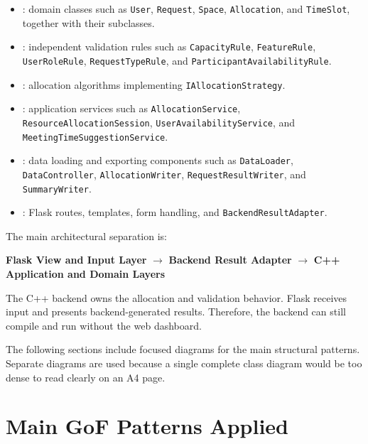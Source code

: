 \documentclass[12pt,a4paper]{article}
\begin{document}
\begin{itemize}
    \item {}: domain classes such as \texttt{User},
    \texttt{Request}, \texttt{Space}, \texttt{Allocation}, and
    \texttt{TimeSlot}, together with their subclasses.

    \item {}: independent validation rules such as
    \texttt{CapacityRule}, \texttt{FeatureRule}, \texttt{UserRoleRule},
    \texttt{RequestTypeRule}, and \texttt{ParticipantAvailabilityRule}.

    \item {}: allocation algorithms implementing
    \texttt{IAllocationStrategy}.

    \item {}: application services such as
    \texttt{AllocationService}, \texttt{ResourceAllocationSession},
    \texttt{UserAvailabilityService}, and
    \texttt{MeetingTimeSuggestionService}.

    \item {}: data loading and exporting components such as
    \texttt{DataLoader}, \texttt{DataController},
    \texttt{AllocationWriter}, \texttt{RequestResultWriter}, and
    \texttt{SummaryWriter}.

    \item {}: Flask routes, templates, form handling, and
    \texttt{BackendResultAdapter}.
\end{itemize}

The main architectural separation is:

\begin{center}
\textbf{Flask View and Input Layer}
$\longrightarrow$
\textbf{Backend Result Adapter}
$\longrightarrow$
\textbf{C++ Application and Domain Layers}
\end{center}

The C++ backend owns the allocation and validation behavior. Flask receives
input and presents backend-generated results. Therefore, the backend can still
compile and run without the web dashboard.

The following sections include focused diagrams for the main structural
patterns. Separate diagrams are used because a single complete class diagram
would be too dense to read clearly on an A4 page.

\section{Main GoF Patterns Applied}
\end{document}

